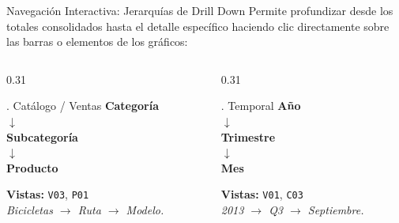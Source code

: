\documentclass[aspectratio=169, 10pt]{beamer}
\begin{document}
\begin{frame}{Navegación Interactiva: Jerarquías de Drill Down}
    Permite profundizar desde los totales consolidados hasta el detalle específico haciendo clic directamente sobre las barras o elementos de los gráficos:
    
    \vspace{0.35cm}
    \begin{columns}[t]
        \begin{column}{0.31\textwidth}
            \begin{block}{. Catálogo / Ventas}
                \small
                \centering
                \textbf{Categoría}\\
                $\downarrow$\\[0.08cm]
                \textbf{Subcategoría}\\
                $\downarrow$\\[0.08cm]
                \textbf{Producto}\\[0.25cm]
                \raggedright
                \footnotesize
                \textbf{Vistas:} \texttt{V03}, \texttt{P01}\\
                \textit{Bicicletas $\rightarrow$ Ruta $\rightarrow$ Modelo.}
            \end{block}
        \end{column}
        
        \begin{column}{0.31\textwidth}
            \begin{block}{. Temporal}
                \small
                \centering
                \textbf{Año}\\
                $\downarrow$\\[0.08cm]
                \textbf{Trimestre}\\
                $\downarrow$\\[0.08cm]
                \textbf{Mes}\\[0.25cm]
                \raggedright
                \footnotesize
                \textbf{Vistas:} \texttt{V01}, \texttt{C03}\\
                \textit{2013 $\rightarrow$ Q3 $\rightarrow$ Septiembre.}
            \end{block}
        \end{column}
        

\end{columns}
\end{frame}
\end{document}
